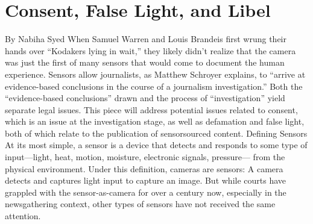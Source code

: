 \section{Consent, False Light, and Libel}
By Nabiha Syed
When Samuel Warren and Louis Brandeis first wrung their hands over
``Kodakers lying in wait,'' they likely didn't realize that the camera was just
the first of many sensors that would come to document the human experience. Sensors allow journalists, as Matthew Schroyer explains, to ``arrive at
evidence-based conclusions in the course of a journalism investigation.''
Both the ``evidence-based conclusions'' drawn and the process of ``investigation''
yield separate legal issues. This piece will address potential issues
related to consent, which is an issue at the investigation stage, as well as
defamation and false light, both of which relate to the publication of sensorsourced
content.
Defining Sensors
At its most simple, a sensor is a device that detects and responds to some
type of input—light, heat, motion, moisture, electronic signals, pressure—
from the physical environment. Under this definition, cameras are sensors:
A camera detects and captures light input to capture an image. But while
courts have grappled with the sensor-as-camera for over a century now,
especially in the newsgathering context, other types of sensors have not
received the same attention.


